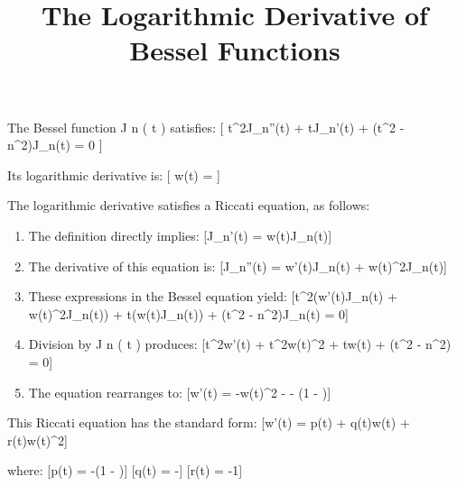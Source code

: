 \documentclass{article}
\title{The Logarithmic Derivative of Bessel Functions}
\author{}
\date{}
\begin{document}
\maketitle

The Bessel function J n ( t ) satisfies:
[
t^2J_n''(t) + tJ_n'(t) + (t^2 - n^2)J_n(t) = 0
]

Its logarithmic derivative is:
[
w(t) = 
]

The logarithmic derivative satisfies a Riccati equation, as follows:

\begin{enumerate}
\item The definition directly implies:
[J_n'(t) = w(t)J_n(t)]

\item The derivative of this equation is:
[J_n''(t) = w'(t)J_n(t) + w(t)^2J_n(t)]

\item These expressions in the Bessel equation yield:
[t^2(w'(t)J_n(t) + w(t)^2J_n(t)) + t(w(t)J_n(t)) + (t^2 - n^2)J_n(t) = 0]

\item Division by J n ( t ) produces:
[t^2w'(t) + t^2w(t)^2 + tw(t) + (t^2 - n^2) = 0]

\item The equation rearranges to:
[w'(t) = -w(t)^2 -  - (1 - )]
\end{enumerate}

This Riccati equation has the standard form:
[w'(t) = p(t) + q(t)w(t) + r(t)w(t)^2]

where:
[p(t) = -(1 - )]
[q(t) = -]
[r(t) = -1]
\end{document}

